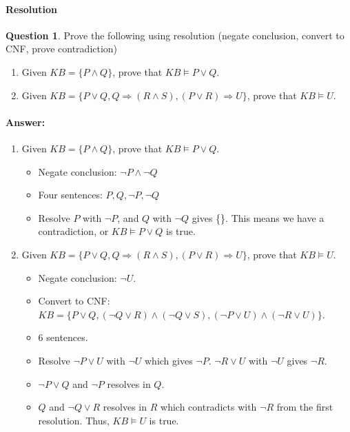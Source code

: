 \documentclass[11pt,a4paper]{article}
\theoremstyle{definition}%
\newtheorem{Q}{Question}[] %
\newcommand{\reponse}[1]{%
\ifthenelse {\boolean{corrige}} {\paragraph{Answer:} \color{darkblue}   #1\color{black}} {}
}
\begin{document}
\paragraph{Resolution}
\begin{Q}
    Prove the following using resolution (negate conclusion, convert to CNF, prove contradiction)
    \begin{enumerate}
        \item Given $KB = \{P \wedge Q\}$, prove that $KB \models P \vee Q$.
        \item Given $KB = \{P \vee Q, Q \Rightarrow (R \wedge S), (P \vee R) \Rightarrow U \}$, prove that $KB \models U$.

    \end{enumerate}

    \reponse{
    \begin{enumerate}
        \item Given $KB = \{P \wedge Q\}$, prove that $KB \models P \vee Q$.

            \begin{itemize}
                \item Negate conclusion: $\neg P \wedge \neg Q$
                \item Four sentences: $P, Q, \neg P, \neg Q$
                \item Resolve $P$ with $\neg P$, and $Q$ with $\neg Q$ gives \{\}. This means we have
                    a contradiction, or $KB \models P \vee Q$ is true.
            \end{itemize}

        \item Given $KB = \{P \vee Q, Q \Rightarrow (R \wedge S), (P \vee R) \Rightarrow U \}$, prove that $KB \models U$.
            \begin{itemize}
                \item Negate conclusion: $\neg U$.
                \item Convert to CNF: $KB = \{P \vee Q, (\neg Q \vee R) \wedge (\neg Q \vee S), (\neg P \vee U) \wedge (\neg R \vee U) \}$.
                \item 6 sentences.
                \item Resolve $\neg P \vee U$ with $\neg U$ which gives $\neg P$. $\neg R \vee U$ with $\neg U$ gives
                    $\neg R$.
                \item $\neg P \vee Q$ and $\neg P$ resolves in $Q$.
                \item $Q$ and $\neg Q \vee R$ resolves in $R$ which contradicts with $\neg R$ from the first
                    resolution. Thus, $KB \models U$ is true.
            \end{itemize}

    \end{enumerate}

    }
\end{Q}
\end{document}
